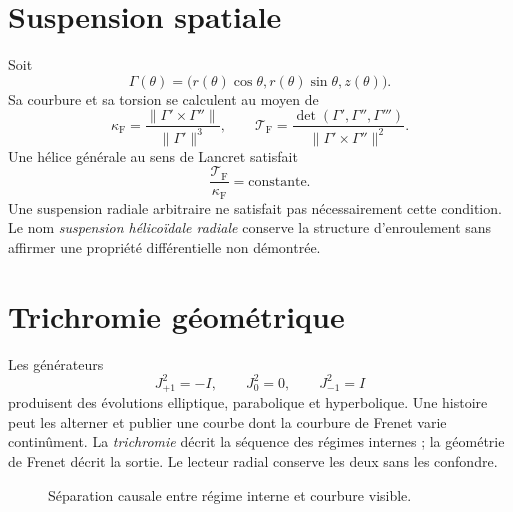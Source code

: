 \section{Suspension spatiale}

Soit
\[
 \Gamma(\theta)=
 \bigl(r(\theta)\cos\theta,r(\theta)\sin\theta,z(\theta)\bigr).
\]
Sa courbure et sa torsion se calculent au moyen de
\[
 \kappa_{\mathrm{F}}=\frac{\|\Gamma'\times\Gamma''\|}{\|\Gamma'\|^3},
 \qquad
 \mathcal T_{\mathrm{F}}=
 \frac{\det(\Gamma',\Gamma'',\Gamma''')}
 {\|\Gamma'\times\Gamma''\|^2}.
\]
Une hélice générale au sens de Lancret satisfait
\[
 \frac{\mathcal T_{\mathrm{F}}}{\kappa_{\mathrm{F}}}=\text{constante}.
\]
Une suspension radiale arbitraire ne satisfait pas nécessairement cette condition. Le nom \emph{suspension hélicoïdale radiale} conserve la structure d'enroulement sans affirmer une propriété différentielle non démontrée.

\section{Trichromie géométrique}

Les générateurs
\[
 J_{+1}^2=-I,\qquad J_0^2=0,\qquad J_{-1}^2=I
\]
produisent des évolutions elliptique, parabolique et hyperbolique. Une histoire peut les alterner et publier une courbe dont la courbure de Frenet varie continûment. La \emph{trichromie} décrit la séquence des régimes internes ; la géométrie de Frenet décrit la sortie. Le lecteur radial conserve les deux sans les confondre.

\begin{figure}[htbp]
\centering
{}
\caption{Séparation causale entre régime interne et courbure visible.}
\label{espiral:fig:trit-frenet}
\end{figure}

